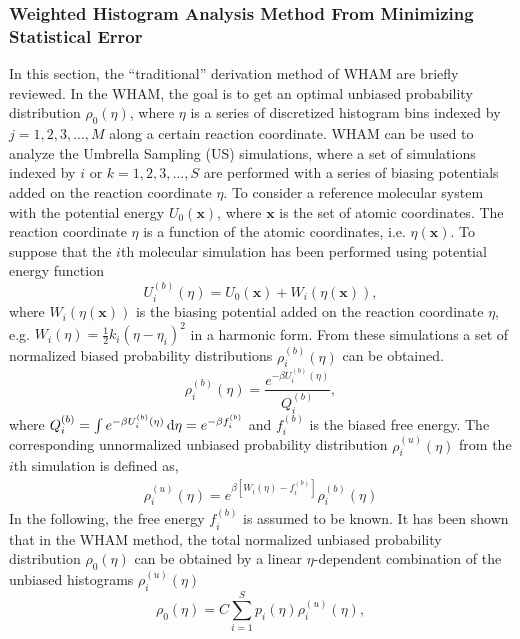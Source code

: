 \subsubsection{Weighted Histogram Analysis Method From Minimizing Statistical Error}
In this section, the ``traditional'' derivation method of WHAM are briefly reviewed.\cite{SouailleCPC2001} In the WHAM, the goal is to get an optimal unbiased probability distribution $\rho_{0}(\eta)$, where $\eta$ is a series of discretized histogram bins indexed by $j=1,2,3,...,M$ along a certain reaction coordinate. WHAM can be used to analyze the Umbrella Sampling (US) simulations, where a set of simulations indexed by $i$ or $k=1,2,3,...,S$ are performed with a series of biasing potentials added on the reaction coordinate $\eta$. To consider a reference molecular system with the potential energy $U_{0}(\textbf{x})$, where $\textbf{x}$ is the set of atomic coordinates. The reaction coordinate $\eta$ is a function of the atomic coordinates, i.e. $\eta(\textbf{x})$. To suppose that the $i$th molecular simulation has been performed using potential energy function
\begin{equation}
U_{i}^{(b)}(\eta) = U_{0}(\textbf{x}) + W_{i}(\eta(\textbf{x})),
\label{Eq:biasmd}
\end{equation}
where $W_{i}(\eta(\textbf{x}))$ is the biasing potential added on the reaction coordinate $\eta$, e.g. $W_{i}(\eta)=\frac{1}{2}k_{i}(\eta-\eta_{i})^2$ in a harmonic form. From these simulations a set of normalized biased probability distributions ${\rho_{i}^{(b)}(\eta)}$ can be obtained.
\begin{equation}
\rho_{i}^{(b)}(\eta) = \frac{e^{-\beta U_{i}^{(b)}(\eta)}}{Q_{i}^{(b)}},
\label{Eq:bias}
\end{equation}
where $Q_{i}^{(b)}=\int e^{-\beta U_{i}^{(b)}(\eta)} \mathop{}\!\mathrm{d}\eta = e^{-\beta f_{i}^{(b)}}$ and $f_{i}^{(b)}$ is the biased free energy.
The corresponding unnormalized unbiased probability distribution $\rho_{i}^{(u)}(\eta)$ from the $i$th simulation is defined as, 
\begin{align}
\rho_{i}^{(u)}(\eta) = e^{\beta[W_{i}(\eta)-f_{i}^{(b)}]}\rho_{i}^{(b)}(\eta)
\label{Eq:unbias}
\end{align}
In the following, the free energy $f_{i}^{(b)}$ is assumed to be known. 
It has been shown that in the WHAM method, the total normalized unbiased probability distribution $\rho_{0}(\eta)$ can be obtained by a linear $\eta$-dependent combination of the unbiased histograms $\rho_{i}^{(u)}(\eta)$ 
\begin{equation}
\rho_{0}(\eta)=C\sum_{i=1}^{S}p_{i}(\eta)\rho_{i}^{(u)}(\eta),
\label{Eq:unbias0}
\end{equation}  

